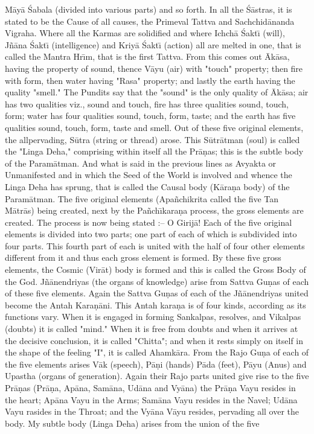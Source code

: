 M\=ay\=a \'Sabala (divided into various parts) and so forth. In all the \'S\=astras, it is stated to be the Cause of all causes, the Primeval Tattva and Sachchid\=ananda Vigraha. Where all the Karmas are solidified and where Ichch\=a \'Sakt\={\i} (will), J\~n\=ana \'Sakt\={\i} (intelligence) and Kriy\=a \'Sakt\={\i} (action) all are melted in one, that is called the Mantra Hr\={\i}m, that is the first Tattva. From this comes out \=Ak\=asa, having the property of sound, thence V\=ayu (air) with "touch" property; then fire with form, then water having "Rasa" property; and lastly the earth having the quality "smell." The Pundits say that the "sound" is the only quality of \=Ak\=asa; air has two qualities viz., sound and touch, fire has three qualities sound, touch, form; water has four qualities sound, touch, form, taste; and the earth has five qualities sound, touch, form, taste and smell. Out of these five original elements, the allpervading, S\=utra (string or thread) arose. This S\=utr\=atman (soul) is called the "Linga Deha," comprising within itself all the Pr\=a\d{n}as; this is the subtle body of the Param\=atman. And what is said in the previous lines as Avyakta or Unmanifested and in which the Seed of the World is involved and whence the Linga Deha has sprung, that is called the Causal body (K\=ara\d{n}a body) of the Param\=atman. The five original elements (Apa\~nchikrita called the five Tan M\=atr\=as) being created, next by the Pa\~nch\={\i}kara\d{n}a process, the gross elements are created. The process is now being stated :-- O Girij\=a! Each of the five original elements is divided into two parts; one part of each of which is subdivided into four parts. This fourth part of each is united with the half of four other elements different from it and thus each gross element is formed. By these five gross elements, the Cosmic (Vir\=at) body is formed and this is called the Gross Body of the God. J\~n\=anendriyas (the organs of knowledge) arise from Sattva Gu\d{n}as of each of these five elements. Again the Sattva Gu\d{n}as of each of the J\~n\=anendriyas united become the Antah Kara\d{n}\=ani. This Antah kara\d{n}a is of four kinds, according as its functions vary. When it is engaged in forming Sankalpas, resolves, and Vikalpas (doubts) it is called "mind." When it is free from doubts and when it arrives at the decisive conclusion, it is called "Chitta"; and when it rests simply on itself in the shape of the feeling "I", it is called Ahamk\=ara. From the Rajo Gu\d{n}a of each of the five elements arises V\=ak (speech), P\=a\d{n}i (hands) P\=ada (feet), P\=ayu (Anus) and Upastha (organs of generation). Again their Rajo parts united give rise to the five Pr\=a\d{n}as (Pr\=a\d{n}a, Ap\=ana, Sam\=ana, Ud\=ana and Vy\=ana) the Pr\=a\d{n}a Vayu resides in the heart; Ap\=ana Vayu in the Arms; Sam\=ana Vayu resides in the Navel; Ud\=ana Vayu rasides in the Throat; and the Vy\=ana V\=ayu resides, pervading all over the body. My subtle body (Linga Deha) arises from the union of the five


